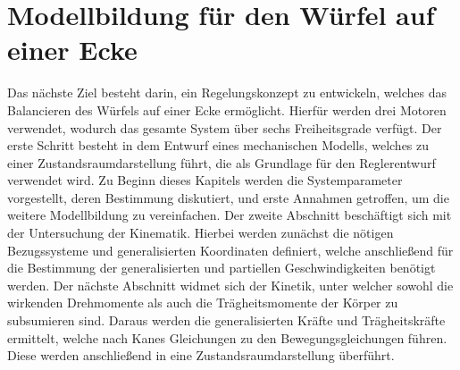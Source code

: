 \ifx\FORMAT\undefined


\fi

\chapter{Modellbildung für den Würfel auf einer Ecke}\label{chapter_TM_Corner}
Das nächste Ziel besteht darin, ein Regelungskonzept zu entwickeln, welches das Balancieren des Würfels auf einer Ecke ermöglicht. Hierfür werden drei Motoren verwendet, wodurch das gesamte System über sechs Freiheitsgrade verfügt. Der erste Schritt besteht in dem Entwurf eines mechanischen Modells, welches zu einer Zustandsraumdarstellung führt, die als Grundlage für den Reglerentwurf verwendet wird.
Zu Beginn dieses Kapitels werden die Systemparameter vorgestellt, deren Bestimmung diskutiert, und erste Annahmen getroffen, um die weitere Modellbildung zu vereinfachen. Der zweite Abschnitt beschäftigt sich mit der Untersuchung der Kinematik. Hierbei werden zunächst die nötigen Bezugssysteme und generalisierten Koordinaten definiert, welche anschließend für die Bestimmung der generalisierten und partiellen Geschwindigkeiten benötigt werden.
Der nächste Abschnitt widmet sich der Kinetik, unter welcher sowohl die wirkenden Drehmomente als auch die Trägheitsmomente der Körper zu subsumieren sind. Daraus werden die generalisierten Kräfte und Trägheitskräfte ermittelt, welche nach Kanes Gleichungen zu den Bewegungsgleichungen führen. Diese werden anschließend in eine Zustandsraumdarstellung überführt.
\newpage

\newpage

\newpage


\ifx\FORMAT\undefined

\fi